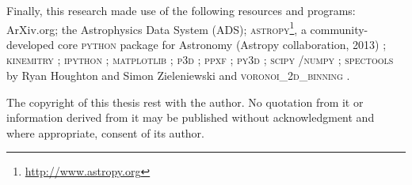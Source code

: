 \begin{originalitylong}
Finally, this research made use of the following resources and programs: ArXiv.org; the Astrophysics Data System (ADS); \textsc{astropy}\footnote{\url{http://www.astropy.org}}, a community-developed core \textsc{python} package for Astronomy (Astropy collaboration, 2013) \citep{TheAstropyCollaboration2013}; \textsc{kinemitry} \citep{Krajnovi2006}; \textsc{ipython} \citep{Perez2007}; \textsc{matplotlib} \citep{Hunter2007}; \textsc{p3d} \citep{Sandin2010, Sandin2011}; \textsc{ppxf} \citep{Cappellari2004}; \textsc{py3d} \citep{Sanchez2011, Husemann2013, Husemann2014}; \textsc{scipy} \citep{Oliphant2007, Millman2011}/\textsc{numpy} \citep{VanderWalt2011}; \textsc{spectools} by Ryan Houghton and Simon Zieleniewski and \textsc{voronoi\_2d\_binning} \citep[including the SAURON colormaps; ][]{Cappellari2003}.

The copyright of this thesis rest with the author. No quotation from it or information derived from it may be published without acknowledgment and where appropriate, consent of its author.
\end{originalitylong}